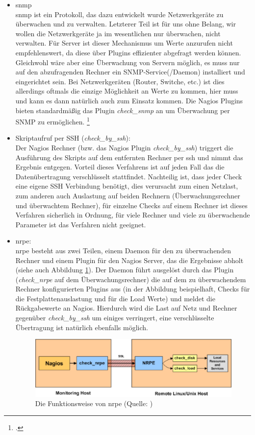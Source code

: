 \documentclass[12pt,a4paper,parskip,listof=totoc,bibliography=totoc]{scrreprt}
\begin{document}
	\begin{itemize}
		\item \acrfull{snmp}\\
		\acrshort{snmp} ist ein Protokoll, das dazu entwickelt wurde Netzwerkgeräte zu überwachen und zu verwalten. Letzterer Teil ist für uns ohne Belang, wir wollen die Netzwerkgeräte ja im wesentlichen nur überwachen, nicht verwalten. Für Server ist dieser Mechanismus um Werte anzurufen nicht empfehlenswert, da diese über Plugins effizienter abgefragt werden können. Gleichwohl wäre aber eine Überwachung von Servern möglich, es muss nur auf den abzufragenden Rechner ein SNMP-Service(/Daemon) installiert und eingerichtet sein. Bei Netzwerkgeräten (Router, Switche, etc.) ist dies allerdings oftmals die einzige Möglichkeit an Werte zu kommen, hier muss und kann es dann natürlich auch zum Einsatz kommen. Die Nagios Plugins bieten standardmäßig das Plugin \textit{check\_snmp} an um Überwachung per SNMP zu ermöglichen.
		\footcite[Kapitel 11]{barthnagios}
		\item Skriptaufruf per SSH (\textit{check\_by\_ssh}): \\
		Der Nagios Rechner (bzw. das Nagios Plugin \textit{check\_by\_ssh}) triggert die Ausführung des Skripts auf dem entfernten Rechner per ssh und nimmt das Ergebnis entgegen. Vorteil dieses Verfahrens ist auf jeden Fall das die Datenübertragung verschlüsselt stattfindet. Nachteilig ist, dass jeder Check eine eigene SSH Verbindung benötigt, dies verursacht zum einen Netzlast, zum anderen auch Auslastung auf beiden Rechnern (Überwachungsrechner und überwachtem Rechner), für einzelne Checks auf einem Rechner ist dieses Verfahren sicherlich in Ordnung, für viele Rechner und viele zu überwachende Parameter ist das Verfahren nicht geeignet.
		\item \acrfull{nrpe}: \\
		\acrshort{nrpe} besteht aus zwei Teilen, einem Daemon für den zu überwachenden Rechner und einem Plugin für den Nagios Server, das die Ergebnisse abholt (siehe auch Abbildung \ref{fig:nrpe}). Der Daemon führt ausgelöst durch das Plugin (\textit{check\_nrpe} auf dem Überwachungsrechner) die auf dem zu überwachendem Rechner konfigurierten Plugins aus (in der Abbildung beispielhaft, Checks für die Festplattenauslastung und für die Load Werte) und meldet die Rückgabewerte an Nagios. Hierdurch wird die Last auf Netz und Rechner gegenüber \textit{check\_by\_ssh} um einiges verringert, eine verschlüsselte Übertragung ist natürlich ebenfalls möglich.
		\begin{figure}[h!]
			\centering
			\includegraphics[width=1\linewidth]{pics/nrpe}
			\caption[Funktionsweise NRPE]{Die Funktionsweise von \acrlong{nrpe} (Quelle: \cite{nagioscoreaddons})}
			\label{fig:nrpe}
		\end{figure}
	\end{itemize}
	
\end{document}

